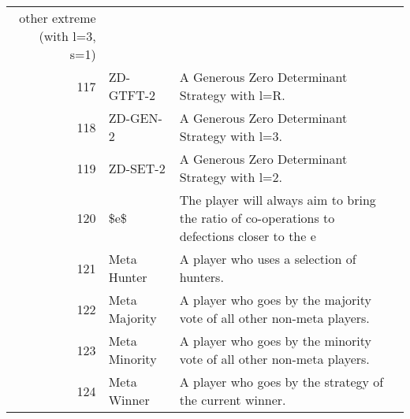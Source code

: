 \begin{table}[H]
\begin{adjustbox}{height=0.8\textwidth, width=1.1\textwidth}
\begin{tabular}{rlll}
	other extreme (with l=3, s=1)                                                                                                                                                                                                                                                                                                                                                                                                                                                                                                                                                                                                                                                                                                                                                                                                                                                                                                                  \\
	117  & ZD-GTFT-2                   & A Generous Zero Determinant Strategy with l=R.                                                                                    \\
	118  & ZD-GEN-2                    & A Generous Zero Determinant Strategy with l=3.                                                                                    \\
	119  & ZD-SET-2                    & A Generous Zero Determinant Strategy with l=2.                                                                                    \\
	120  & \$e\$                       & The player will always aim to bring the ratio of co-operations to defections closer to the e                                      \\
	121  & Meta Hunter                 & A player who uses a selection of hunters.                                                                                         \\
	122  & Meta Majority               & A player who goes by the majority vote of all other non-meta players.                                                             \\
	123  & Meta Minority               & A player who goes by the minority vote of all other non-meta players.                                                             \\
	124  & Meta Winner                 & A player who goes by the strategy of the current winner.                                                                          \\

\end{tabular}
\end{adjustbox}
\end{table}
